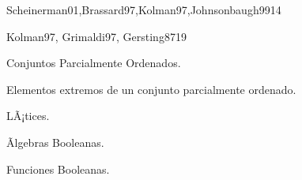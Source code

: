 \begin{syllabus}
\begin{unit}{\DSTHREEDef}{Scheinerman01,Brassard97,Kolman97,Johnsonbaugh99}{14}
\begin{topics}
      \item \DSTHREETopicNociones
      \item \DSTHREETopicEstructura
      \item \DSTHREETopicPruebas
      \item \DSTHREETopicPruebasy
      \item \DSTHREETopicPruebaspor
      \item \DSTHREETopicPruebasporcontradiccion
      \item \DSTHREETopicInduccion
      \item \DSTHREETopicInduccionfuerte
      \item \DSTHREETopicDefiniciones
      \item \DSTHREETopicEl
   \end{topics}

   \begin{unitgoals}
      \item \DSTHREEObjONE
      \item \DSTHREEObjTWO
      \item \DSTHREEObjTHREE
      \item \DSTHREEObjFOUR
   \end{unitgoals}
\end{unit}

\begin{unit}{\ARONEDef}{Kolman97, Grimaldi97, Gersting87}{19}
\begin{topics}
      \item Conjuntos Parcialmente Ordenados.
      \item Elementos extremos de un conjunto parcialmente ordenado.
      \item LÃ¡tices.
      \item Ãlgebras Booleanas.
      \item Funciones Booleanas.
      \item \ARONETopicExpresiones
      \item \ARONETopicBloques
   \end{topics}
   \begin{unitgoals}
      \item \DSTHREEObjONE
      \item \DSTHREEObjTWO
      \item \DSTHREEObjTHREE
   \end{unitgoals}
\end{unit}


\end{syllabus}
